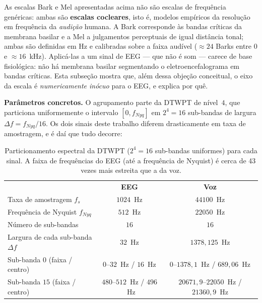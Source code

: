 			\par As escalas Bark e Mel apresentadas acima não são escalas de frequência genéricas: ambas são \textbf{escalas cocleares}, isto é, modelos empíricos da resolução em frequência da \emph{audição} humana. A Bark corresponde às bandas críticas da membrana basilar e a Mel a julgamentos perceptuais de igual distância tonal; ambas são definidas em Hz e calibradas sobre a faixa audível ($\approx\!24$ Barks entre $0$ e $\approx\!16$~kHz). Aplicá-las a um sinal de \ac{EEG} --- que não é som --- carece de base fisiológica: não há membrana basilar segmentando o eletroencefalograma em bandas críticas. Esta subseção mostra que, além dessa objeção conceitual, o eixo da escala é \emph{numericamente inócuo} para o EEG, e explica por quê.

			\par \textbf{Parâmetros concretos.} O agrupamento parte da \ac{DTWPT} de nível~$4$, que particiona uniformemente o intervalo $[0, f_{Nyq}]$ em $2^{4} = 16$ sub-bandas de largura $\Delta f = f_{Nyq}/16$. Os dois sinais deste trabalho diferem drasticamente em taxa de amostragem, e é daí que tudo decorre:

			\begin{table}[H]
				\centering
				\caption[Particionamento espectral da DTWPT por sinal]{Particionamento espectral da DTWPT ($2^4=16$ sub-bandas uniformes) para cada sinal. A faixa de frequências do EEG (até a frequência de Nyquist) é cerca de 43 vezes mais estreita que a da voz.}
				\label{tab:particaoEspectral}
				\small
				\tableZebraStripe
				\begin{tabular}{@{}lcc@{}}
					\tableHeaderRow & \textbf{EEG} & \textbf{Voz} \\
					Taxa de amostragem $f_s$        & $1024$~Hz  & $44100$~Hz \\
					Frequência de Nyquist $f_{Nyq}$ & $512$~Hz   & $22050$~Hz \\
					Número de sub-bandas            & $16$       & $16$ \\
					Largura de cada sub-banda $\Delta f$ & $32$~Hz & $1378{,}125$~Hz \\
					Sub-banda $0$ (faixa / centro)  & $0$--$32$~Hz / $16$~Hz & $0$--$1378{,}1$~Hz / $689{,}06$~Hz \\
					Sub-banda $15$ (faixa / centro) & $480$--$512$~Hz / $496$~Hz & $20671{,}9$--$22050$~Hz / $21360{,}9$~Hz \\
					\bottomrule
				\end{tabular}
			\end{table}

